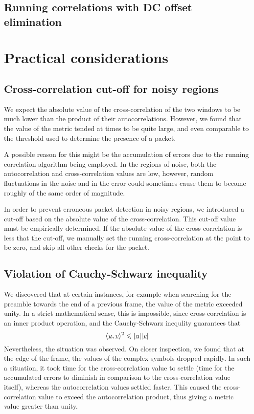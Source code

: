\subsection{Running correlations with DC offset elimination}


\section{Practical considerations}

\subsection{Cross-correlation cut-off for noisy regions}
\label{sec:cross-corr-cut-off}

We expect the absolute value of the cross-correlation of the two windows to be
much lower than the product of their autocorrelations. However, we found that
the value of the metric tended at times to be quite large, and even comparable
to the threshold used to determine the presence of a packet.

A possible reason for this might be the accumulation of errors due to the
running correlation algorithm being employed. In the regions of noise, both the
autocorrelation and cross-correlation values are low, however, random
fluctuations in the noise and in the error could sometimes cause them to become
roughly of the same order of magnitude.

In order to prevent erroneous packet detection in noisy regions, we introduced
a cut-off based on the absolute value of the cross-correlation. This cut-off
value must be empirically determined. If the absolute value of the
cross-correlation is less that the cut-off, we manually set the running
cross-correlation at the point to be zero, and skip all other checks for the
packet.


\subsection{Violation of Cauchy-Schwarz inequality}

We discovered that at certain instances, for example when searching for the
preamble towards the end of a previous frame, the value of the metric exceeded
unity. In a strict mathematical sense, this is impossible, since
cross-correlation is an inner product operation, and the Cauchy-Schwarz
inequlity guarantees that
$$ \langle \underbar{\emph{u}}, \underbar{\emph{v}} \rangle ^2 \leqslant |\underbar{\emph{u}}||\underbar{\emph{v}}| $$
Nevertheless, the situation was observed. On closer inspection, we found that
at the edge of the frame, the values of the complex symbols dropped rapidly. In
such a situation, it took time for the cross-correlation value to settle (time
for the accumulated errors to diminish in comparison to the cross-correlation
value itself), whereas the autocorrelation values settled faster. This caused
the cross-correlation value to exceed the autocorrelation product, thus giving
a metric value greater than unity.

